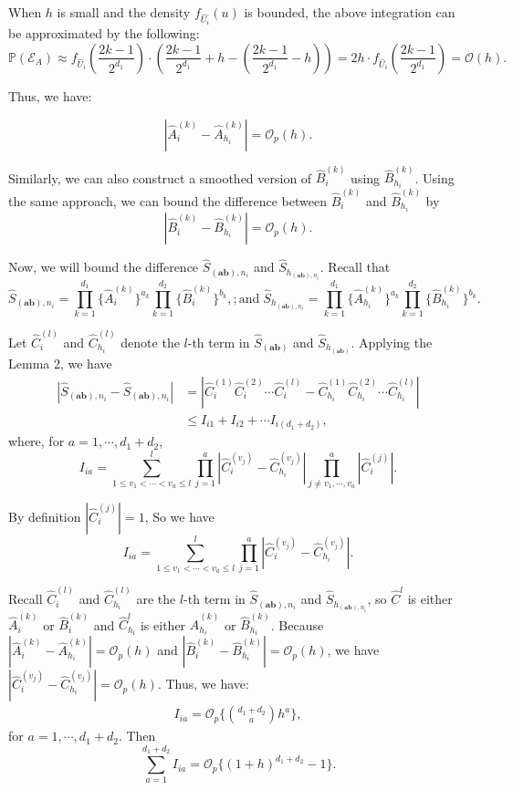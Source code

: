 \documentclass[12pt,reqno,oneside]{amsbook}
\theoremstyle{definition}
\theoremstyle{remark}
\begin{document}
When $h$ is small and the density $f_{\hat{U_i}}(u)$ is bounded, the above integration can be approximated by the following:
   \[
   \mathbb{P}\left( \mathcal{E}_A \right) \approx f_{\hat{U}_i}\left( \frac{2k-1}{2^{d_1}} \right) \cdot \left( \frac{2k-1}{2^{d_1}} + h - \left( \frac{2k-1}{2^{d_1}} - h \right) \right) = 2h \cdot f_{\hat{U}_i}\left( \frac{2k-1}{2^{d_1}} \right)= \mathcal{O}(h).
   \]


Thus, we have:

\[
|\hat{A}_i^{(k)} - \hat{A}_{{h}_i}^{(k)}| = \mathcal{O}_p(h).
\]

Similarly, we can also construct a smoothed version of $\hat{B}_i^{(k)}$ using $\hat{B}_{{h}_i}^{(k)}$. 
Using the same approach, we can bound the difference between $\hat{B}_{i}^{(k)}$ and $\hat{B}_{{h}_i}^{(k)}$ by
\[
|\hat{B}_i^{(k)} - \hat{B}_{{h}_i}^{(k)}| = \mathcal{O}_p(h).
\]

Now, we will bound the difference 
$\hat{S}_{{(\mathbf{ab}),n_i}}$ and $\hat{S}_{h_{(\mathbf{ab}),n_i}}$. Recall that
$$
\hat{S}_{(\mathbf{ab}),n_i}=\prod_{k=1}^{d_1} \{\hat{A}_{i}^{(k)}\}^{a_k} \prod_{k=1}^{d_2} \{\hat{B}_{i}^{(k)}\}^{b_k},
;\mbox{and}\; \hat{S}_{h_{(\mathbf{ab}),n_i}}=\prod_{k=1}^{d_1} \{\hat{A}_{{h}_i}^{(k)}\}^{a_k} \prod_{k=1}^{d_2} \{\hat{B}_{{h}_i}^{(k)}\}^{b_k}.
$$


Let $\hat{C}_i^{(l)}$ and $\hat{C}_{{h}_i}^{(l)}$ denote the $l$-th term in $\hat{S}_{(\mathbf{ab})}$ and $\hat{S}_{h_{(\mathbf{ab})}}$. Applying the Lemma 2,
we have
\begin{align*}
     |\hat{S}_{(\mathbf{ab}),n_i} - \hat{S}_{(\mathbf{ab}),n_i}|
     &=|\hat{C}_i^{(1)}\hat{C}_i^{(2)}\cdots\hat{C}_i^{(l)}-\hat{C}_{{h}_i}^{(1)}\hat{C}_{{h}_i}^{(2)}\cdots \hat{C}_{{h}_i}^{(l)} | 
      \\
      & \le  I_{i1} + I_{i2} + \cdots I_{i(d_1+d_2)}, 
\end{align*}
where, for $a=1,\cdots, d_1+d_2$, 
$$
I_{ia}= \sum_{1\leq v_1<\cdots<v_a\leq l}^l\prod_{j=1}^a |\hat{C}_i^{(v_j)}-\hat{C}^{(v_j)}_{h_i}| 
\prod_{j\neq v_1,\cdots, v_a}^a |\hat{C}^{(j)}_{i}|.
$$


By definition $|\hat{C}_{i}^{(j)}|= 1$,  So we have 
$$
I_{ia}= \sum_{1\leq v_1<\cdots<v_a\leq l}^l\prod_{j=1}^a |\hat{C}_i^{(v_j)}-\hat{C}^{(v_j)}_{h_i}|.
$$



Recall $\hat{C}_i^{(l)}$ and $\hat{C}_{{h}_i}^{(l)}$ are the $l$-th term in $\hat{S}_{(\mathbf{ab}),n_i}$ and $\hat{S}_{h_{(\mathbf{ab}),n_i}}$, so $\hat{C}^{l}$ is 
either $\hat{A}_i^{(k)}$ or $\hat{B}_i^{(k)}$ and $\hat{C}_{{h}_i}^{l}$ is either $\hat{A}_{{h}_i}^{(k)}$ or 
$\hat{B}_{{h}_i}^{(k)}$. Because $|\hat{A}_i^{(k)} - \hat{A}_{{h}_i}^{(k)}| = \mathcal{O}_p(h)$ and $|\hat{B}_i^{(k)} - \hat{B}_{{h}_i}^{(k)}| = 
\mathcal{O}_p(h)$, we have $|\hat{C}_i^{(v_j)}-\hat{C}^{(v_j)}_{h_i}|=\mathcal{O}_p(h)$.
Thus, we have: 
\begin{align*}
    I_{ia} = \mathcal{O}
    _p\Big\{\binom{d_1+d_2}{a}h^a\},
\end{align*}
for $a=1,\cdots, d_1+d_2$. Then 
$$
\sum_{a=1}^{d_1+d_2}I_{ia}=\mathcal{O}
    _p\{(1+h)^{d_1+d_2}-1\}.
$$
\end{document}
